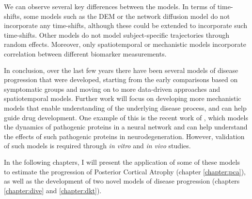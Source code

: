 We can observe several key differences between the models. In terms of time-shifts, some models such as the DEM or the network diffusion model do not incorporate any time-shifts, although these could be extended to incorporate such time-shifts. Other models do not model subject-specific trajectories through random effects. Moreover, only spatiotemporal or mechanistic models incorporate correlation between different biomarker measurements. 

In conclusion, over the last few years there have been several models of disease progression that were developed, starting from the early comparisons based on symptomatic groups and moving on to more data-driven approaches and spatiotemporal models. Further work will focus on developing more mechanistic models that enable understanding of the underlying disease process, and can help guide drug development. One example of this is the recent work of \cite{georgiadis2018computational}, which models the dynamics of pathogenic proteins in a neural network and can help understand the effects of such pathogenic proteins in neurodegeneration. However, validation of such models is required through \emph{in vitro} and \emph{in vivo} studies. 

In the following chapters, I will present the application of some of these models to estimate the progression of Posterior Cortical Atrophy (chapter \ref{chapter:pca}), as well as the development of two novel models of disease progression (chapters \ref{chapter:dive} and \ref{chapter:dkt}).




\newcommand{\xmark}{\ding{55}}%

\newcommand{\myyes}{\textcolor{green1}{\Large{\checkmark}}}
\newcommand{\myno}{\textcolor{red1}{\Large{\xmark}}}

